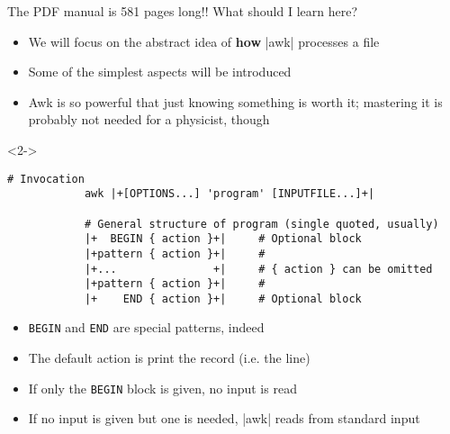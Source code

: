 \begin{frame}[fragile]{The PDF manual is 581 pages long!! What should I learn here?}
    \vspace{-4mm}
    \begin{itemize}
        \item We will focus on the abstract idea of \textbf{how} \bash|awk| processes a file
        \item Some of the simplest aspects will be introduced
        \item Awk is so powerful that just knowing something is worth it; mastering it is probably not needed for a physicist, though
    \end{itemize}
    \begin{uncoverenv}<2->
        \begin{lstlisting}[style=MyBash, numbers=none, aboveskip=2mm, belowskip=-5mm]
            # Invocation
            awk |+[OPTIONS...] 'program' [INPUTFILE...]+|

            # General structure of program (single quoted, usually)
            |+  BEGIN { action }+|     # Optional block
            |+pattern { action }+|     #
            |+...               +|     # { action } can be omitted
            |+pattern { action }+|     #
            |+    END { action }+|     # Optional block
        \end{lstlisting}
    \end{uncoverenv}
    \begin{itemize}[<3>]
        \item \texttt{BEGIN} and \texttt{END} are special patterns, indeed
        \item The default action is print the record (i.e. the line)
        \item If only the \texttt{BEGIN} block is given, no input is read
        \item If no input is given but one is needed, \bash|awk| reads from standard input
    \end{itemize}
\end{frame}

